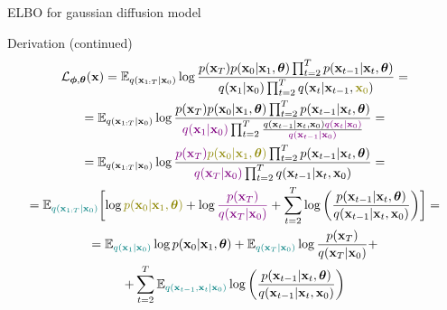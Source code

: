 \begin{frame}{ELBO for gaussian diffusion model}
	\begin{block}{Derivation (continued)}
		\vspace{-0.7cm}
		{\small
		\begin{multline*}
			\cL_{\bphi, \btheta}(\bx) = \bbE_{q(\bx_{1:T} | \bx_0)} \log \frac{p(\bx_T) p(\bx_0 | \bx_1, \btheta) \prod_{t=2}^T p(\bx_{t-1} | \bx_t, \btheta) }{q(\bx_1 | \bx_0)\prod_{t=2}^T q(\bx_t | \bx_{t-1}, {\color{olive}\bx_0})}  = \\ 
			= \bbE_{q(\bx_{1:T} | \bx_0)} \log \frac{p(\bx_T) p(\bx_0 | \bx_1, \btheta) \prod_{t=2}^T p(\bx_{t-1} | \bx_t, \btheta) }{{\color{violet}q(\bx_1 | \bx_0)}\prod_{t=2}^T \frac{q(\bx_{t-1}|\bx_t, \bx_0) {\color{violet}q(\bx_{t} | \bx_0)}}{{\color{violet}q(\bx_{t-1}| \bx_0)}}}  = \\
			= \bbE_{q(\bx_{1:T} | \bx_0)} \log \frac{{\color{violet}p(\bx_T)} {\color{olive}p(\bx_0 | \bx_1, \btheta)} \prod_{t=2}^T p(\bx_{t-1} | \bx_t, \btheta) }{{\color{violet}q(\bx_T | \bx_0)}\prod_{t=2}^T q(\bx_{t-1}|\bx_t, \bx_0)}  = \\
			= \bbE_{{\color{teal}q(\bx_{1:T} | \bx_0)}} \biggl[ \log {\color{olive}p(\bx_0 | \bx_1, \btheta)} + \log {\color{violet}\frac{p(\bx_T)}{q(\bx_T | \bx_0)}} + \sum_{t=2}^T \log \left( \frac{p(\bx_{t-1} | \bx_t, \btheta)}{q(\bx_{t-1}|\bx_{t}, \bx_0)}\right) \biggr] = \\
			 = \bbE_{{\color{teal}q(\bx_1 | \bx_0)}} \log p(\bx_0 | \bx_1, \btheta) + \bbE_{{\color{teal}q(\bx_T | \bx_0)}} \log \frac{p(\bx_T)}{q(\bx_T | \bx_0)} + \\
			  + \sum_{t=2}^T \bbE_{{\color{teal}q(\bx_{t-1}, \bx_t | \bx_0)}} \log \left( \frac{p(\bx_{t-1} | \bx_t, \btheta)}{q(\bx_{t-1}|\bx_{t}, \bx_0)}\right) 
		\end{multline*}
		}
		\vspace{-0.3cm}
	\end{block}
\end{frame}
